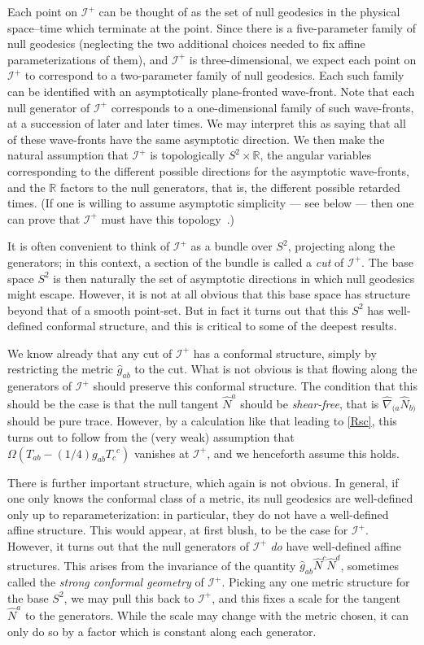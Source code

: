 \documentclass[12pt]{article}
\newcommand{\scrif}{{{\mathscr I}^{+}}}
\newcommand{\R}{{\mathbb R}}
\begin{document}
Each point on $\scrif$ can  be thought of as the set of null geodesics in the physical space--time which terminate at the point.  Since there is a five-parameter family of null geodesics (neglecting the two additional choices needed to fix affine parameterizations of them), and $\scrif$ is three-dimensional, we expect each point on $\scrif$ to correspond to a two-parameter family of null geodesics.  
Each such family can be identified with an asymptotically plane-fronted wave-front.
Note that each null generator of $\scrif$ corresponds to a one-dimensional family of such wave-fronts, at a succession of later and later times.  We may interpret this as saying that all of these wave-fronts have the same asymptotic direction.
We then make the natural assumption that $\scrif$ is topologically
$S^2\times\R$, the angular variables corresponding to the different possible directions for the asymptotic wave-fronts, and the $\R$ factors to the null generators, that is, the different possible retarded times.
 (If one is willing to assume asymptotic simplicity --- see below --- then one can prove that $\scrif$ must have this topology~\citep{Penrose:1965,Geroch:1971}.)  

It is often convenient to think of $\scrif$ as a bundle over $S^2$, projecting along the generators; in this context, a section of the bundle is called a {\em cut} of $\scrif$.  The base space $S^2$ is then naturally the set of asymptotic directions in which null geodesics might escape.  However, it is not at all obvious that this base space has structure beyond that of a smooth point-set.    But in fact it turns out that this $S^2$ has well-defined conformal structure, and this is critical to some of the deepest results.

We know already that any cut of $\scrif$ has a conformal structure, simply by restricting the metric ${\hat g}_{ab}$ to the cut.  What is not obvious is that flowing along the generators of $\scrif$ should preserve this conformal structure.  The condition that this should be the case is that the null tangent ${\hat N}^a$ should be {\em shear-free}, that is ${\hat\nabla}_{(a}{\hat N}_{b)}$ should be pure trace.  However, by a calculation like that leading to \eqref{Rsc}, this turns out to follow from the (very weak) assumption  that $\Omega (T_{ab}-(1/4)g_{ab}T_c{}^c)$ vanishes at $\scrif$, and we henceforth assume this holds.

There is further important structure, which again is not obvious.  In general, if one only knows the conformal class of a metric, its null geodesics are well-defined only up to reparameterization:  in particular, they do not have a well-defined affine structure.  This would appear, at first blush, to be the case for $\scrif$.  However, it turns out that the null generators of $\scrif$ {\em do} have well-defined affine structures.  This arises from the invariance of the quantity ${\hat g}_{ab}{\hat N}^c{\hat N}^d$, sometimes called the {\em strong conformal geometry} of $\scrif$.  Picking any one metric structure for the base $S^2$, we may pull this back to $\scrif$, and this fixes a scale for the tangent ${\hat N}^a$ to the generators.  While the scale may change with the metric chosen, it can only do so by a factor which is constant along each generator. 
\end{document}
